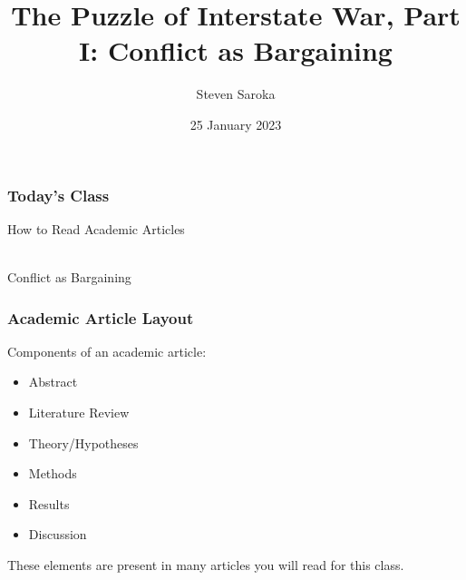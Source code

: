 \documentclass[handout]{beamer}
\title[The Puzzle of War (I)]{\LARGE{The Puzzle of Interstate War, Part I: Conflict as Bargaining}}
\author[POLI 150]{Steven Saroka}
\institute{POLI 150}
\date{25 January 2023}
\begin{document}
\begin{frame}
\titlepage %
\end{frame}









\begin{frame} 
	\frametitle{\LARGE{Today's Class}}
	\begin{itemize}
		\Large{
			\item How to Read Academic Articles
			\\~\\ 
			\item Conflict as Bargaining
		}
	\end{itemize}
\end{frame}

\begin{frame} 
	\frametitle{\LARGE{Academic Article Layout}}
	Components of an academic article:
	\begin{itemize}
		\item Abstract
		\item Literature Review
		\item Theory/Hypotheses
		\item Methods
		\item Results
		\item Discussion
	\end{itemize}
	These elements are present in many articles you will read for this class.
\end{frame}
\end{document}
